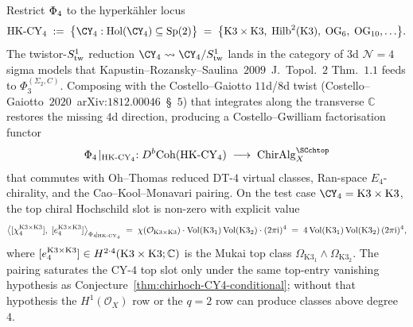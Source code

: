\begin{conjecture}
\label{thm:phi4-HK-restricted-K3xK3-pairing}
\ClaimStatusConjectured
Restrict $\Phi_{4}$ to the hyperk\"ahler locus
\begin{equation}
\label{eq:HK-locus-CY4}
 \HKCY \;:=\;
 \bigl\{\CY_4 : \mathrm{Hol}(\CY_4)\subseteq\mathrm{Sp}(2)\bigr\}
 \;=\;
 \bigl\{\mathrm{K3}\times\mathrm{K3},\;\mathrm{Hilb}^2(\mathrm{K3}),\;
 \mathrm{OG}_6,\;\mathrm{OG}_{10},\ldots\bigr\}.
\end{equation}
The twistor-$S^1_{\mathrm{tw}}$ reduction $\CY_4\leadsto\CY_4/\Stwist$ lands in
the category of $3$d $\mathcal N=4$ sigma models that
Kapustin--Rozansky--Saulina~$2009$~J.\ Topol.~$2$ Thm.~$1.1$ feeds to
$\Phi_3^{(\Sigma_2,C)}$. Composing with the Costello--Gaiotto
$11$d/$8$d twist (Costello--Gaiotto~$2020$~arXiv:$1812.00046$~\S~$5$)
that integrates along the transverse $\mathbb C$ restores the missing
$4$d direction, producing a Costello--Gwilliam factorisation functor
\begin{equation}
\label{eq:phi4-HK-restricted-functor}
 \PhiFourHK:D^b\mathrm{Coh}(\HKCY)\;\longrightarrow\;
 \mathrm{ChirAlg}_X^{\SCchtop}
\end{equation}
that commutes with Oh--Thomas reduced DT-$4$ virtual classes,
Ran-space $E_4$-chirality, and the Cao--Kool--Monavari pairing.
On the test case $\CY_4=\KKX$, the top chiral Hochschild slot is
non-zero with explicit value
\begin{equation}
\label{eq:chirhoch4-K3xK3-explicit}
 \bigl\langle
 [\chi_4^{\mathrm{K3}\times\mathrm{K3}}],\;[e_4^{\mathrm{K3}\times\mathrm{K3}}]
 \bigr\rangle_{\Phi_{4}\!\mid_{\mathrm{HK}\text{-}\mathrm{CY}_4}}
 \;=\;\chi(\mathcal O_{\mathrm{K3}\times\mathrm{K3}})\cdot\mathrm{Vol}(\mathrm{K3}_1)\,\mathrm{Vol}(\mathrm{K3}_2)\cdot(2\pi\mathrm i)^4
 \;=\;4\,\mathrm{Vol}(\mathrm{K3}_1)\,\mathrm{Vol}(\mathrm{K3}_2)\,(2\pi\mathrm i)^4,
\end{equation}
where $[e_4^{\mathrm{K3}\times\mathrm{K3}}]\in H^{2\cdot 4}(\mathrm{K3}\times\mathrm{K3};\mathbb C)$ is the
Mukai top class $\Omega_{\mathrm{K3}_1}\wedge\Omega_{\mathrm{K3}_2}$.
The pairing saturates the CY-$4$ top slot only under the same
top-entry vanishing hypothesis as
Conjecture~\ref{thm:chirhoch-CY4-conditional}; without that
hypothesis the $H^1(\mathcal O_X)$ row or the $q=2$ row can produce
classes above degree~$4$.
\end{conjecture}

